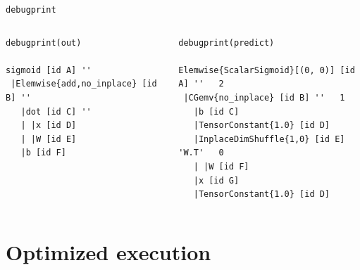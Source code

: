 \documentclass[a4paper,9pt]{beamer}
\begin{document}
\begin{frame}[fragile]{\texttt{debugprint}}
  \begin{columns}
    \begin{column}{0.45\textwidth}
    \footnotesize
      \begin{verbatim}
debugprint(out)

sigmoid [id A] ''   
 |Elemwise{add,no_inplace} [id B] ''   
   |dot [id C] ''   
   | |x [id D]
   | |W [id E]
   |b [id F]
      \end{verbatim}
    \end{column}

    \begin{column}{0.50\textwidth}
    \footnotesize
      \begin{verbatim}
debugprint(predict)

Elemwise{ScalarSigmoid}[(0, 0)] [id A] ''   2
 |CGemv{no_inplace} [id B] ''   1
   |b [id C]
   |TensorConstant{1.0} [id D]
   |InplaceDimShuffle{1,0} [id E] 'W.T'   0
   | |W [id F]
   |x [id G]
   |TensorConstant{1.0} [id D]
      \end{verbatim}
    \end{column}
  \end{columns}
\end{frame}


\section{Optimized execution}
\begin{frame}
  \tableofcontents[currentsection]
\end{frame}
\end{document}
